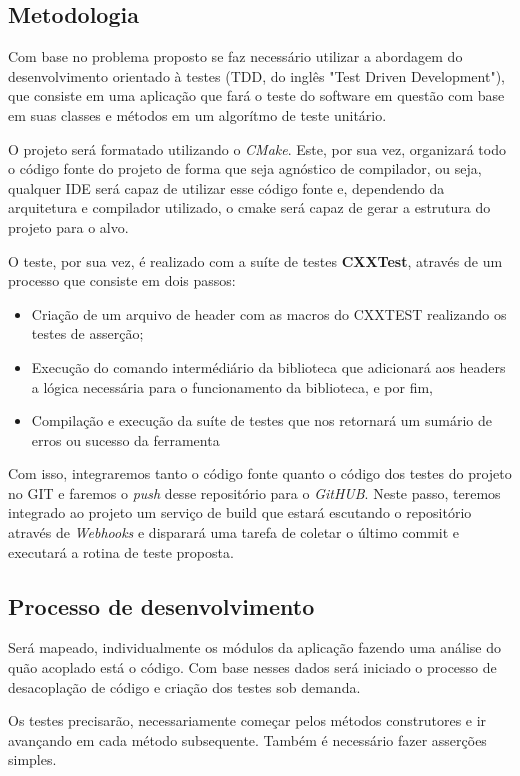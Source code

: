 \documentclass[
	article,			%
	12pt,				%
	oneside,			%
	a4paper,			%
	english,			
	brazil,
	sumario=tradicional
	]{abntex2}
\begin{document}
\subsection{Metodologia}
Com base no problema proposto se faz necessário utilizar a abordagem do desenvolvimento orientado à testes (TDD, do inglês "Test Driven Development"), que consiste em uma aplicação que fará o teste do software em questão com base em suas classes e métodos em um algorítmo de teste unitário.

O projeto será formatado utilizando o \textit{CMake}. Este, por sua vez, organizará todo o código fonte do projeto de forma que seja agnóstico de compilador, ou seja, qualquer IDE será capaz de utilizar esse código fonte e, dependendo da arquitetura e compilador utilizado, o cmake será capaz de gerar a estrutura do projeto para o alvo. 

O teste, por sua vez, é realizado com a suíte de testes \textbf{CXXTest}, através de um processo que consiste em dois passos:

\begin{itemize}
	\item{Criação de um arquivo de header com as macros do CXXTEST realizando os testes de asserção;}
	\item{Execução do comando intermédiário da biblioteca que adicionará aos headers a lógica necessária para o funcionamento da biblioteca, e por fim,}
	\item{Compilação e execução da suíte de testes que nos retornará um sumário de erros ou sucesso da ferramenta}
\end{itemize}

Com isso, integraremos tanto o código fonte quanto o código dos testes do projeto no GIT e faremos o \textit{push} desse repositório para o \textit{GitHUB}. Neste passo, teremos integrado ao projeto um serviço de build que estará escutando o repositório através de \textit{Webhooks} e disparará uma tarefa de coletar o último commit e executará a rotina de teste proposta.

\subsection{Processo de desenvolvimento}
Será mapeado, individualmente os módulos da aplicação fazendo uma análise do quão acoplado está o código. Com base nesses dados será iniciado o processo de desacoplação de código e criação dos testes sob demanda.

Os testes precisarão, necessariamente começar pelos métodos construtores e ir avançando em cada método subsequente. Também é necessário fazer asserções simples.
\end{document}
